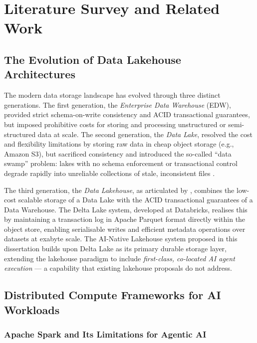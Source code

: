 \documentclass[12pt, a4paper]{report}
\begin{document}
\chapter{Literature Survey and Related Work}
\label{ch:literature}

\section{The Evolution of Data Lakehouse Architectures}
\label{sec:lakehouse_evolution}

The modern data storage landscape has evolved through three distinct generations.
The first generation, the \emph{Enterprise Data Warehouse} (EDW), provided strict
schema-on-write consistency and ACID transactional guarantees, but imposed prohibitive
costs for storing and processing unstructured or semi-structured data at scale.
The second generation, the \emph{Data Lake}, resolved the cost and flexibility
limitations by storing raw data in cheap object storage (e.g., Amazon S3), but sacrificed
consistency and introduced the so-called ``data swamp'' problem: lakes with no schema
enforcement or transactional control degrade rapidly into unreliable collections of
stale, inconsistent files \citep{armbrust2020delta}.

The third generation, the \emph{Data Lakehouse}, as articulated by
\citet{armbrust2020delta}, combines the low-cost scalable storage of a Data Lake with
the ACID transactional guarantees of a Data Warehouse. The Delta Lake system, developed
at Databricks, realises this by maintaining a transaction log in Apache Parquet format
directly within the object store, enabling serialisable writes and efficient metadata
operations over datasets at exabyte scale.
The AI-Native Lakehouse system proposed in this dissertation builds upon Delta Lake
as its primary durable storage layer, extending the lakehouse paradigm to include
\emph{first-class, co-located AI agent execution} — a capability that existing lakehouse
proposals do not address.

\section{Distributed Compute Frameworks for AI Workloads}
\label{sec:distributed_compute}

\subsection{Apache Spark and Its Limitations for Agentic AI}
\label{ssec:spark}
\end{document}
